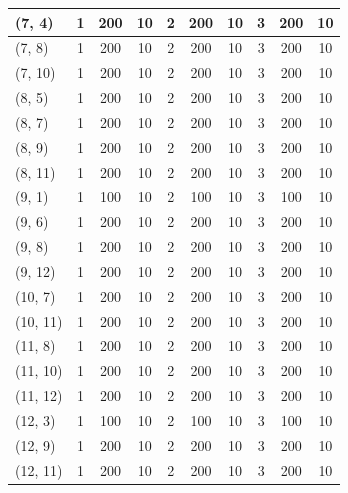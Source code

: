 \documentclass{article}
\begin{document}
\begin{longtable}{||l||c|c|c||c|c|c||c|c|c||}
\hline
(7, 4) & 1 & 200 & 10 & 2 & 200 & 10 & 3 & 200 & 10 \\
\hline
(7, 8) & 1 & 200 & 10 & 2 & 200 & 10 & 3 & 200 & 10 \\
\hline
(7, 10) & 1 & 200 & 10 & 2 & 200 & 10 & 3 & 200 & 10 \\
\hline
(8, 5) & 1 & 200 & 10 & 2 & 200 & 10 & 3 & 200 & 10 \\
\hline
(8, 7) & 1 & 200 & 10 & 2 & 200 & 10 & 3 & 200 & 10 \\
\hline
(8, 9) & 1 & 200 & 10 & 2 & 200 & 10 & 3 & 200 & 10 \\
\hline
(8, 11) & 1 & 200 & 10 & 2 & 200 & 10 & 3 & 200 & 10 \\
\hline
(9, 1) & 1 & 100 & 10 & 2 & 100 & 10 & 3 & 100 & 10 \\
\hline
(9, 6) & 1 & 200 & 10 & 2 & 200 & 10 & 3 & 200 & 10 \\
\hline
(9, 8) & 1 & 200 & 10 & 2 & 200 & 10 & 3 & 200 & 10 \\
\hline
(9, 12) & 1 & 200 & 10 & 2 & 200 & 10 & 3 & 200 & 10 \\
\hline
(10, 7) & 1 & 200 & 10 & 2 & 200 & 10 & 3 & 200 & 10 \\
\hline
(10, 11) & 1 & 200 & 10 & 2 & 200 & 10 & 3 & 200 & 10 \\
\hline
(11, 8) & 1 & 200 & 10 & 2 & 200 & 10 & 3 & 200 & 10 \\
\hline
(11, 10) & 1 & 200 & 10 & 2 & 200 & 10 & 3 & 200 & 10 \\
\hline
(11, 12) & 1 & 200 & 10 & 2 & 200 & 10 & 3 & 200 & 10 \\
\hline
(12, 3) & 1 & 100 & 10 & 2 & 100 & 10 & 3 & 100 & 10 \\
\hline
(12, 9) & 1 & 200 & 10 & 2 & 200 & 10 & 3 & 200 & 10 \\
\hline
(12, 11) & 1 & 200 & 10 & 2 & 200 & 10 & 3 & 200 & 10 \\
\hline
\end{longtable}
\end{document}
